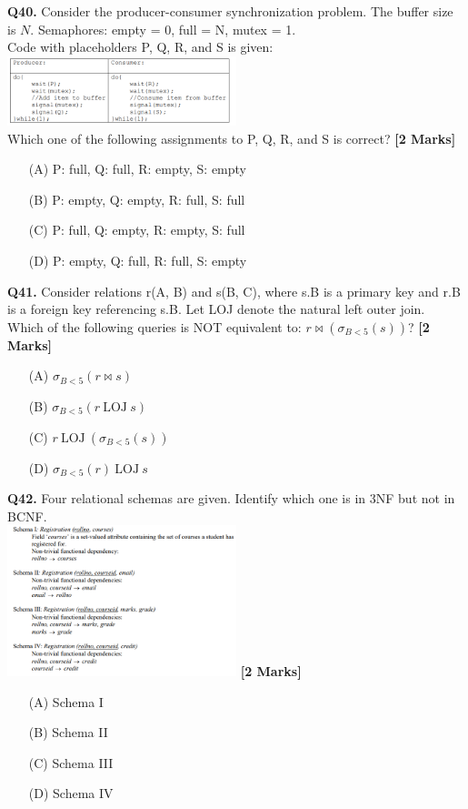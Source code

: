 \documentclass[11pt]{article}
\newcommand{\questionb}[2]{
    \noindent\textbf{Q#2.} #1 \hfill \textbf{[2 Marks]}
}
\begin{document}
\questionb{Consider the producer-consumer synchronization problem. The buffer size is \( N \). Semaphores: empty = 0, full = N, mutex = 1.\\
Code with placeholders P, Q, R, and S is given:\\
\includegraphics[width=0.5\textwidth]{figures/40}\\
Which one of the following assignments to P, Q, R, and S is correct?}{40}
\begin{enumerate}
    \item[(A)] P: full, Q: full, R: empty, S: empty
    \item[(B)] P: empty, Q: empty, R: full, S: full
    \item[(C)] P: full, Q: empty, R: empty, S: full
    \item[(D)] P: empty, Q: full, R: full, S: empty
\end{enumerate}
\vspace{0.5cm}

\questionb{Consider relations r(A, B) and s(B, C), where s.B is a primary key and r.B is a foreign key referencing s.B. Let LOJ denote the natural left outer join.\\
Which of the following queries is NOT equivalent to: \( r \bowtie (\sigma_{B<5}(s)) \)?}{41}
\begin{enumerate}
    \item[(A)] \( \sigma_{B<5}(r \bowtie s) \)
    \item[(B)] \( \sigma_{B<5}(r\ \text{LOJ}\ s) \)
    \item[(C)] \( r\ \text{LOJ}\ (\sigma_{B<5}(s)) \)
    \item[(D)] \( \sigma_{B<5}(r)\ \text{LOJ}\ s \)
\end{enumerate}
\vspace{0.5cm}

\questionb{Four relational schemas are given. Identify which one is in 3NF but not in BCNF.\\
\includegraphics[width=0.5\textwidth]{figures/42}}{42}
\begin{enumerate}
    \item[(A)] Schema I
    \item[(B)] Schema II
    \item[(C)] Schema III
    \item[(D)] Schema IV
\end{enumerate}
\vspace{0.5cm}
\end{document}
